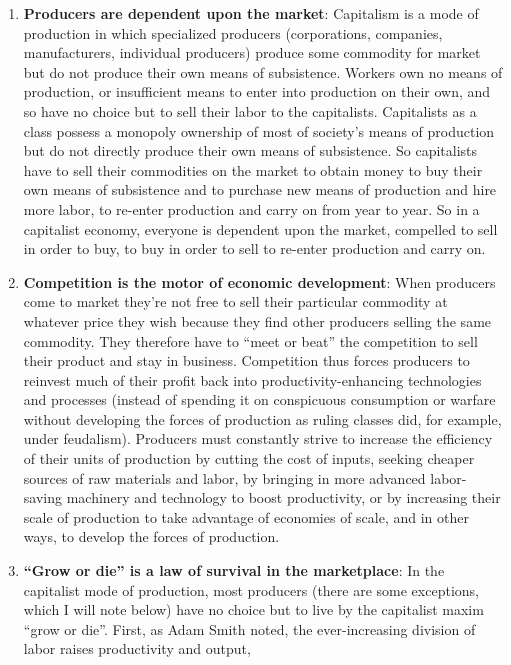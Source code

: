 \documentclass[
]{book}
\begin{document}
\begin{enumerate}
\def\labelenumi{\arabic{enumi}.}
\item
  \textbf{Producers are dependent upon the market}: Capitalism is a mode of production
  in which specialized producers (corporations, companies, manufacturers, individual
  producers) produce some commodity for market but do not produce their own means
  of subsistence. Workers own no means of production, or insufficient means to enter
  into production on their own, and so have no choice but to sell their labor to the
  capitalists. Capitalists as a class possess a monopoly ownership of most of society's
  means of production but do not directly produce their own means of subsistence. So
  capitalists have to sell their commodities on the market to obtain money to buy their
  own means of subsistence and to purchase new means of production and hire more
  labor, to re-enter production and carry on from year to year. So in a capitalist
  economy, everyone is dependent upon the market, compelled to sell in order to buy,
  to buy in order to sell to re-enter production and carry on.
\item
  \textbf{Competition is the motor of economic development}: When producers come to
  market they're not free to sell their particular commodity at whatever price they
  wish because they find other producers selling the same commodity. They therefore
  have to ``meet or beat'' the competition to sell their product and stay in business.
  Competition thus forces producers to reinvest much of their profit back into
  productivity-enhancing technologies and processes (instead of spending it on
  conspicuous consumption or warfare without developing the forces of production as
  ruling classes did, for example, under feudalism). Producers must constantly strive
  to increase the efficiency of their units of production by cutting the cost of inputs,
  seeking cheaper sources of raw materials and labor, by bringing in more advanced
  labor-saving machinery and technology to boost productivity, or by increasing their
  scale of production to take advantage of economies of scale, and in other ways, to
  develop the forces of production.
\item
  \textbf{``Grow or die'' is a law of survival in the marketplace}: In the capitalist mode
  of production, most producers (there are some exceptions, which I will note below)
  have no choice but to live by the capitalist maxim ``grow or die''. First, as Adam
  Smith noted, the ever-increasing division of labor raises productivity and output,

\end{enumerate}
\end{document}
